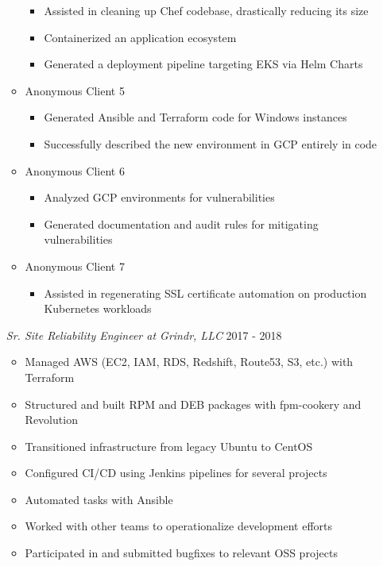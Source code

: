\documentclass[line]{docs/resume/res}
\begin{document}
\begin{resume}
\begin{itemize}
\begin{itemize}
    \begin{itemize} \itemsep -2pt
      \item Assisted in cleaning up Chef codebase, drastically reducing its size
      \item Containerized an application ecosystem
      \item Generated a deployment pipeline targeting EKS via Helm Charts
    \end{itemize}
    \item Anonymous Client 5
    \begin{itemize} \itemsep -2pt
      \item Generated Ansible and Terraform code for Windows instances
      \item Successfully described the new environment in GCP entirely in code
    \end{itemize}
    \item Anonymous Client 6
    \begin{itemize} \itemsep -2pt
      \item Analyzed GCP environments for vulnerabilities
      \item Generated documentation and audit rules for mitigating vulnerabilities
    \end{itemize}
    \item Anonymous Client 7
    \begin{itemize} \itemsep -2pt
      \item Assisted in regenerating SSL certificate automation on production \\
        Kubernetes workloads
    \end{itemize}
  \end{itemize}

  {\sl Sr. Site Reliability Engineer at Grindr, LLC} \hfill 2017 - 2018
  \begin{itemize} \itemsep -2pt %
    \item Managed AWS (EC2, IAM, RDS, Redshift, Route53, S3, etc.) with Terraform
    \item Structured and built RPM and DEB packages with fpm-cookery and Revolution
    \item Transitioned infrastructure from legacy Ubuntu to CentOS
    \item Configured CI/CD using Jenkins pipelines for several projects
    \item Automated tasks with Ansible
    \item Worked with other teams to operationalize development efforts
    \item Participated in and submitted bugfixes to relevant OSS projects
  \end{itemize}


\end{itemize}
\end{resume}
\end{document}
